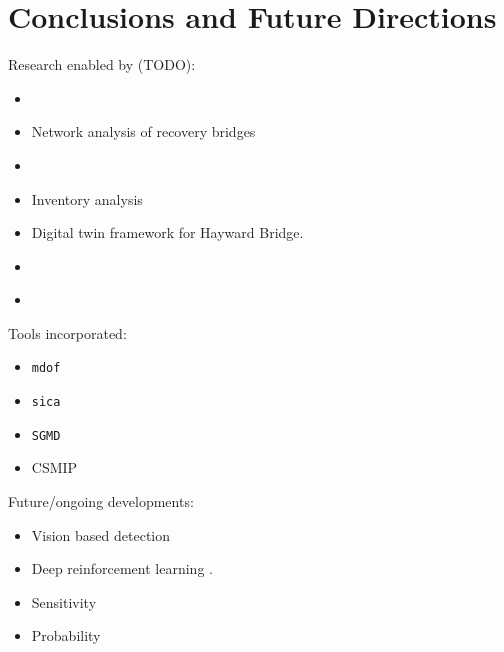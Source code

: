 \FloatBarrier 

\section{Conclusions and Future Directions}

Research enabled by \BRACE{} (TODO):
\begin{itemize}
    \item \cite{muin2024human} 
    \item \cite{li2025surrogate} Network analysis of recovery bridges
    \item \cite{xinjie2025prediction}
    \item \cite{chern2024crosssectional} Inventory analysis
    \item \cite{chern2024digital} Digital twin framework for Hayward Bridge.
    \item \cite{chern2025evaces}
    \item \cite{jose}
\end{itemize}

Tools incorporated:
\begin{itemize}
    \item \texttt{mdof} \cite{chern2024mdof,arici2003system}
    \item \texttt{sica} \cite{pang2026sica}
    \item \texttt{SGMD} \cite{mccallen_peer-lbnl_nodate}
    \item CSMIP 
\end{itemize}

Future/ongoing developments:
\begin{itemize}
    \item Vision based detection \citep{teng2024development}
    \item Deep reinforcement learning \citep{pang2024deep}.
    \item Sensitivity \citep{lee2005seismic}
    \item Probability \citep{lee2004probabilistic,gardoni2002probabilistic}
\end{itemize}